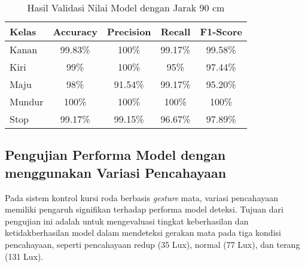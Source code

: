 \begin{table}[ht]
  \caption{Hasil Validasi Nilai Model dengan Jarak 90 cm}
  \label{tb:90cm}
  \centering
  \begin{tabular}{|l|c|c|c|c|}
  \hline
  \rowcolor[HTML]{C0C0C0} 
  \textbf{Kelas} & \textbf{Accuracy} & \textbf{Precision} & \textbf{Recall} & \textbf{F1-Score} \\ \hline
  Kanan    & 99.83\%            & 100\%             & 99.17\%           & 99.58\%            \\ \hline
  Kiri     & 99\%          & 100\%           & 95\%           & 97.44\%           \\ \hline
  Maju      & 98\%          & 91.54\%           & 99.17\%          & 95.20\%          \\ \hline
  Mundur     & 100\%            & 100\%             & 100\%           & 100\%            \\ \hline
  Stop  & 99.17\%            & 99.15\%             & 96.67\%           & 97.89\%            \\ \hline
  \end{tabular}
\end{table}
    
\subsection{Pengujian Performa Model dengan menggunakan Variasi Pencahayaan}

Pada sistem kontrol kursi roda berbasis \emph{gesture} mata, variasi pencahayaan memiliki pengaruh signifikan terhadap performa model deteksi. Tujuan dari pengujian ini adalah untuk mengevaluasi tingkat keberhasilan dan ketidakberhasilan model dalam mendeteksi gerakan mata pada tiga kondisi pencahayaan, seperti pencahayaan redup (35 Lux), normal (77 Lux), dan terang (131 Lux).

